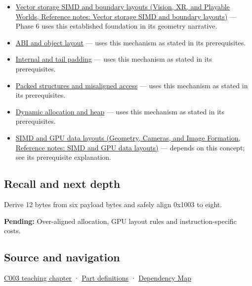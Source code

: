 \begin{itemize}
\item
  \href{../07-Vision-XR-and-Playable-Worlds/main.pdf\#nameddest=appendix-26bf6bf2fb8b}{Vector storage SIMD and boundary layouts (Vision, XR, and Playable Worlds, Reference notes: Vector storage SIMD and boundary layouts)} --- Phase 6 uses this established foundation in its geometry narrative.
\item
  \hyperref[appendix-c4ac6bb0fff8]{ABI and object layout} --- uses this mechanism as stated in its prerequisites.
\item
  \hyperref[appendix-f52f8c5a3afd]{Internal and tail padding} --- uses this mechanism as stated in its prerequisites.
\item
  \hyperref[appendix-0682dbfc5f0e]{Packed structures and misaligned access} --- uses this mechanism as stated in its prerequisites.
\item
  \hyperref[appendix-c3480f7d9ff3]{Dynamic allocation and heap} --- uses this mechanism as stated in its prerequisites.
\item
  \href{../03-Geometry-Cameras-and-Image-Formation/main.pdf\#nameddest=appendix-3c7b1a56de01}{SIMD and GPU data layouts (Geometry, Cameras, and Image Formation, Reference notes: SIMD and GPU data layouts)} --- depends on this concept; see its prerequisite explanation.
\end{itemize}

\subsection{Recall and next depth}\label{appendix-a1f7c53b4742-recall-and-next-depth}

Derive 12 bytes from six payload bytes and safely align 0x1003 to eight.

\textbf{Pending:} Over-aligned allocation, GPU layout rules and instruction-specific costs.

\subsection{Source and navigation}\label{appendix-a1f7c53b4742-source-and-navigation}

\hyperref[01-foundations-i-ch002-where-the-bytes-live]{C003 teaching chapter} · \hyperref[appendix-fd090d982a15-m003---parts-41-60]{Part definitions} · \hyperref[appendix-4ad47bdd269a]{Dependency Map}
